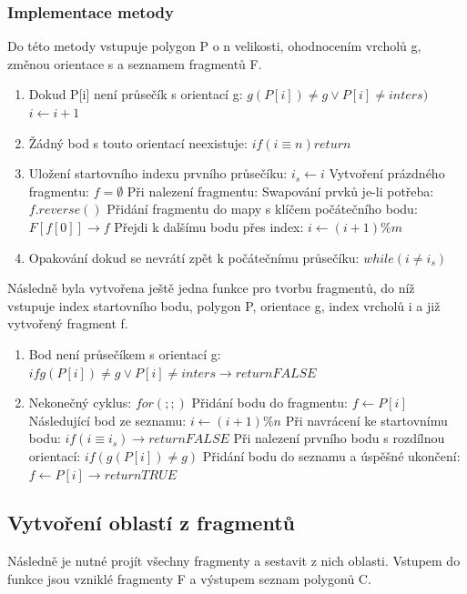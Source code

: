\documentclass[a4paper, 12pt]{article}
\begin{document}
\subsubsection{Implementace metody}
Do této metody vstupuje polygon P o n velikosti, ohodnocením vrcholů g, změnou orientace s a seznamem fragmentů F. 

\begin{enumerate}
\item Dokud P[i] není průsečík s orientací g: $g(P[i]) \neq g \vee P[i] \neq inters )$
\subitem $i \leftarrow i + 1 $
\item Žádný bod s touto orientací neexistuje: $if (i \equiv n) return$
\item Uložení startovního indexu prvního průsečíku: $i_s \leftarrow i$
\subitem Vytvoření prázdného fragmentu: $f = \emptyset $
\subitem Při nalezení fragmentu: 
\subitem Swapování prvků je-li potřeba: $f.reverse()$
\subitem Přidání fragmentu do mapy s klíčem počátečního bodu: $F[f[0]] \rightarrow f$
\subitem Přejdi k dalšímu bodu přes index: $i \leftarrow (i+1)\% m$
\item Opakování dokud se nevrátí zpět k počátečnímu průsečíku: $ while (i \neq i_s)$
\end{enumerate}

Následně byla vytvořena ještě jedna funkce pro tvorbu fragmentů, do níž vstupuje index startovního bodu, polygon P, orientace g, index vrcholů i a již vytvořený fragment f.

\begin{enumerate}
\item Bod není průsečíkem s orientací g: $if g(P[i]) \neq g \vee P[i] \neq inters \rightarrow return FALSE$
\item Nekonečný cyklus: $for (;;)$
\subitem Přidání bodu do fragmentu: $f \leftarrow P[i]$
\subitem Následující bod ze seznamu: $i \leftarrow (i+1)\%n$
\subitem Při navrácení ke startovnímu bodu: $if (i \equiv i_s) \rightarrow return FALSE$
\subitem Při nalezení prvního bodu s rozdílnou orientací: $if (g(P[i]) \neq g)$
\subitem Přidání bodu do seznamu a úspěšné ukončení: $f \leftarrow P[i] \rightarrow return TRUE$
\end{enumerate}


\subsection{Vytvoření oblastí z fragmentů}
Následně je nutné projít všechny fragmenty a sestavit z nich oblasti. Vstupem do funkce jsou vzniklé fragmenty F a výstupem seznam polygonů C.
\end{document}
